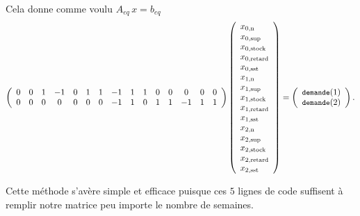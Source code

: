 Cela donne comme voulu $A_{eq} \, x = b_{eq}$
\[
    \left(
    \begin{array}{*{15}c}
      0 & 0 & 1 & -1 & 0 & 1 & 1 & -1 & 1 & 1 & 0 & 0 &  0 & 0 & 0 \\
      0 & 0 & 0 &  0 & 0 & 0 & 0 & -1 & 1 & 0 & 1 & 1 & -1 & 1 & 1 
    \end{array}
    \right)
    \left(
    \begin{array}{*{1}l}
      \myX{0}{n}\\ \myX{0}{sup}\\ \myX{0}{stock}\\ \myX{0}{retard}\\ \myX{0}{sst}\\
      \myX{1}{n}\\ \myX{1}{sup}\\ \myX{1}{stock}\\ \myX{1}{retard}\\ \myX{1}{sst}\\
      \myX{2}{n}\\ \myX{2}{sup}\\ \myX{2}{stock}\\ \myX{2}{retard}\\ \myX{2}{sst}
    \end{array}
    \right)
    = 
    \left(
    \begin{array}{*{1}l}
      \texttts{demande}(1) \\ \texttts{demande}(2)
    \end{array}
    \right)
    \text.
\]

Cette méthode s'avère simple et efficace puisque ces $5$ lignes de code suffisent 
à remplir notre matrice peu importe le nombre de semaines.
